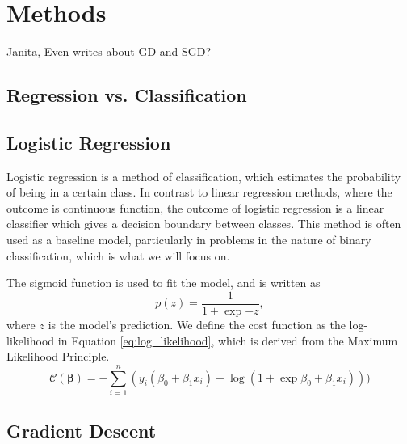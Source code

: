 \section{Methods}\label{sec:methods}
Janita, Even writes about GD and SGD?
\subsection{Regression vs. Classification}\label{ssec:regression_classification}


\subsection{Logistic Regression}\label{ssec:logreg}
Logistic regression is a method of classification, which estimates the probability of being in a certain class. In contrast to linear regression methods, where the outcome is continuous function, the outcome of logistic regression is a linear classifier which gives a decision boundary between classes. This method is often used as a baseline model, particularly in problems in the nature of binary classification, which is what we will focus on.

The sigmoid function is used to fit the model, and is written as
\begin{equation}\label{eq:sigmoid}
    p(z) = \frac{1}{1 + \exp{-z}} , 
\end{equation}
where $z$ is the model's prediction. We define the cost function as the log-likelihood in Equation \eqref{eq:log_likelihood}, which is derived from the Maximum Likelihood Principle.
\begin{equation}\label{eq:log_likelihood}
    \mathcal{C}(\mathbf{\beta}) = - \sum_{i=1}^{n} (y_{i} (\beta_{0} + \beta_{1} x_{i}) - \log (1 + \exp{\beta_{0} + \beta_{1} x_{i}})))
\end{equation}


\subsection{Gradient Descent}\label{ssec:gradient_descent}

